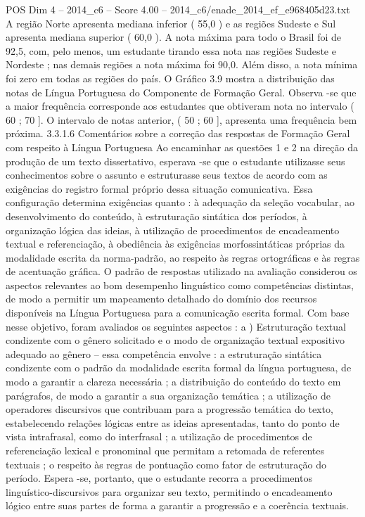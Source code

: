 \begin{textsample}{POS Dim 4 – 2014\_c6 – Score 4.00 – 2014\_c6/enade\_2014\_ef\_e968405d23.txt}
A região Norte apresenta mediana inferior ( 55,0 ) e as regiões Sudeste e Sul apresenta mediana superior ( 60,0 ).
A nota máxima para todo o Brasil foi de 92,5, com, pelo menos, um estudante tirando essa nota nas regiões Sudeste e Nordeste ; nas demais regiões a nota máxima foi 90,0.
Além disso, a nota mínima foi zero em todas as regiões do país.
O Gráfico 3.9 mostra a distribuição das notas de Língua Portuguesa do Componente de Formação Geral.
Observa -se que a maior frequência corresponde aos estudantes que obtiveram nota no intervalo ( 60 ; 70 ].
O intervalo de notas anterior, ( 50 ; 60 ], apresenta uma frequência bem próxima. 3.3.1.6 Comentários sobre a correção das respostas de Formação Geral com respeito à Língua Portuguesa Ao encaminhar as questões 1 e 2 na direção da produção de um texto dissertativo, esperava -se que o estudante utilizasse seus conhecimentos sobre o assunto e estruturasse seus textos de acordo com as exigências do registro formal próprio dessa situação comunicativa.
Essa configuração determina exigências quanto : à adequação da seleção vocabular, ao desenvolvimento do conteúdo, à estruturação sintática dos períodos, à organização lógica das ideias, à utilização de procedimentos de encadeamento textual e referenciação, à obediência às exigências morfossintáticas próprias da modalidade escrita da norma-padrão, ao respeito às regras ortográficas e às regras de acentuação gráfica.
O padrão de respostas utilizado na avaliação considerou os aspectos relevantes ao bom desempenho linguístico como competências distintas, de modo a permitir um mapeamento detalhado do domínio dos recursos disponíveis na Língua Portuguesa para a comunicação escrita formal.
Com base nesse objetivo, foram avaliados os seguintes aspectos : a ) Estruturação textual condizente com o gênero solicitado e o modo de organização textual expositivo adequado ao gênero – essa competência envolve : a estruturação sintática condizente com o padrão da modalidade escrita formal da língua portuguesa, de modo a garantir a clareza necessária ; a distribuição do conteúdo do texto em parágrafos, de modo a garantir a sua organização temática ; a utilização de operadores discursivos que contribuam para a progressão temática do texto, estabelecendo relações lógicas entre as ideias apresentadas, tanto do ponto de vista intrafrasal, como do interfrasal ; a utilização de procedimentos de referenciação lexical e pronominal que permitam a retomada de referentes textuais ; o respeito às regras de pontuação como fator de estruturação do período.
Espera -se, portanto, que o estudante recorra a procedimentos linguístico-discursivos para organizar seu texto, permitindo o encadeamento lógico entre suas partes de forma a garantir a progressão e a coerência textuais.

\end{textsample}
